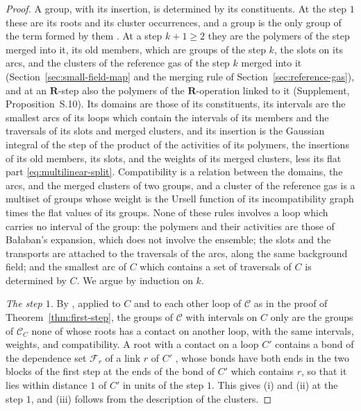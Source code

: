 \documentclass[11pt]{preprint}
\numberwithin{equation}{section}
\theoremstyle{definition}
\theoremstyle{remark}
\theoremstyle{plain}
\begin{document}
\begin{proof}
A group, with its insertion, is determined by its constituents. At the step $1$ these are its roots and its cluster occurrences, and a group is the only group of the term formed by them \cite[Definition~10.1, Lemma~10.2(a)]{WilsonFirstStep}. At a step $k + 1 \geq 2$ they are the polymers of the step merged into it, its old members, which are groups of the step $k$, the slots on its arcs, and the clusters of the reference gas of the step $k$ merged into it (Section~\ref{sec:small-field-map} and the merging rule of Section~\ref{sec:reference-gas}), and at an $\mathbf R$-step also the polymers of the $\mathbf R$-operation linked to it (Supplement, Proposition~S.10). Its domains are those of its constituents, its intervals are the smallest arcs of its loops which contain the intervals of its members and the traversals of its slots and merged clusters, and its insertion is the Gaussian integral of the step of the product of the activities of its polymers, the insertions of its old members, its slots, and the weights of its merged clusters, less its flat part \eqref{eq:multilinear-split}. Compatibility is a relation between the domains, the arcs, and the merged clusters of two groups, and a cluster of the reference gas is a multiset of groups whose weight is the Ursell function of its incompatibility graph times the flat values of its groups. None of these rules involves a loop which carries no interval of the group: the polymers and their activities are those of Ba{\l}aban's expansion, which does not involve the ensemble; the slots and the transports are attached to the traversals of the arcs, along the same background field; and the smallest arc of $C$ which contains a set of traversals of $C$ is determined by $C$. We argue by induction on $k$.

\emph{The step $1$.} By \cite[Lemma~10.2(c)]{WilsonFirstStep}, applied to $C$ and to each other loop of $\mathcal C$ as in the proof of Theorem~\ref{thm:first-step}, the groups of $\mathcal C$ with intervals on $C$ only are the groups of $\mathcal C_C$ none of whose roots has a contact on another loop, with the same intervals, weights, and compatibility. A root with a contact on a loop $C'$ contains a bond of the dependence set $\mathcal F_r$ of a link $r$ of $C'$ \cite[(3.87), Lemma~3.5]{WilsonFirstStep}, whose bonds have both ends in the two blocks of the first step at the ends of the bond of $C'$ which contains $r$, so that it lies within distance $1$ of $C'$ in units of the step $1$. This gives (i) and (ii) at the step $1$, and (iii) follows from the description of the clusters.


\end{proof}
\end{document}
